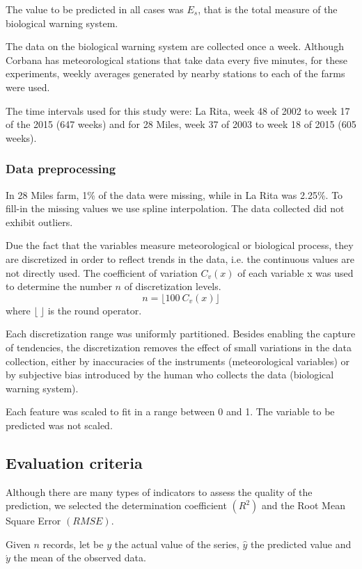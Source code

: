 \documentclass[review]{elsarticle}
\begin{document}
The value to be predicted in all cases was $E_s$, that is the total measure of the biological warning system.  

The data on the biological warning system are collected once a week. Although Corbana has meteorological stations that take data every five minutes, for these experiments, weekly averages generated by nearby stations to each of the farms were used.

The time intervals used for this study were: La Rita, week 48 of 2002 to week 17 of the 2015 (647 weeks) and for 28 Miles, week 37 of 2003 to week 18 of 2015 (605 weeks).

\subsubsection{Data preprocessing}

In 28 Miles farm, 1\% of the data were missing, while in La Rita was 2.25\%. To fill-in the missing values we use spline interpolation. The data collected did not exhibit outliers.

Due the fact that the variables measure meteorological or biological process, they are discretized in order to reflect trends in the data, i.e. the continuous values are not directly used. The coefficient of variation $C_v(x)$ of each variable x was used to determine the number $n$ of discretization levels.
$$n= \lfloor 100 \ C_v(x) \rfloor$$
where $\lfloor \ \rfloor$  is the round operator.

Each discretization range was uniformly partitioned. Besides enabling the capture of tendencies, the discretization removes the effect of small variations in the data collection, either by inaccuracies of the instruments (meteorological variables) or by subjective bias introduced by the human who collects the data (biological warning system). 

Each feature was scaled to fit in a range between 0 and 1. The variable to be predicted was not scaled.

\subsection{Evaluation criteria}

Although there are many types of indicators to assess the quality of the prediction, we selected the determination coefficient $(R^2)$ and the Root Mean Square Error $(RMSE)$.  

Given $n$ records, let be $y$ the actual value of the series, $\hat{y}$ the predicted value and $\acute{y}$ the mean of the observed data.
\end{document}
